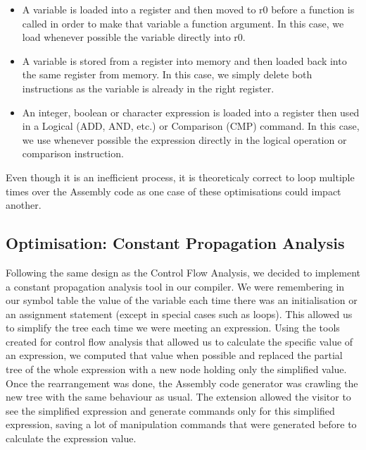 \documentclass[a4wide, 11pt]{article}
\begin{document}
\begin{itemize}
\item A variable is loaded into a register and then moved to r0 before a function is called in order to make that variable a function argument. In this case, we load whenever possible the variable directly into r0.
\item A variable is stored from a register into memory and then loaded back into the same register from memory. In this case, we simply delete both instructions as the variable is already in the right register.
\item An integer, boolean or character expression is loaded into a register then used in a Logical (ADD, AND, etc.) or Comparison (CMP) command. In this case, we use whenever possible the expression directly in the logical operation or comparison  instruction.
\end{itemize}

Even though it is an inefficient process, it is theoreticaly correct to loop multiple times over the Assembly code as one case of these optimisations could impact another.

\subsection{Optimisation: Constant Propagation Analysis}

Following the same design as the Control Flow Analysis, we decided to implement a constant propagation analysis tool in our compiler. We were remembering in our symbol table the value of the variable each time there was an initialisation or an assignment statement (except in special cases such as loops). This allowed us to simplify the tree each time we were meeting an expression. Using the tools created for control flow analysis that allowed us to calculate the specific value of an expression, we computed that value when possible and replaced the partial tree of the whole expression with a new node holding only the simplified value. Once the rearrangement was done, the Assembly code generator was crawling the new tree with the same behaviour as usual. The extension allowed the visitor to see the simplified expression and generate commands only for this simplified expression, saving a lot of manipulation commands that were generated before to calculate the expression value.
\end{document}
